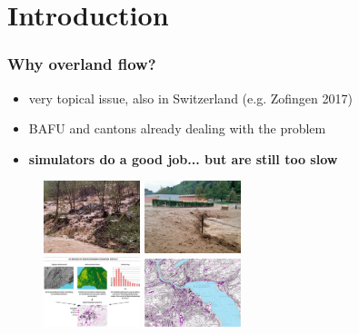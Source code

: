\documentclass[xcolor=dvipsnames, USenglish]{beamer}  %
\begin{document}
\section{Introduction}
  \begin{frame}
    \frametitle{Why overland flow?}
    \begin{itemize}
      \item very topical issue, also in Switzerland (e.g. Zofingen 2017)
      \item BAFU and cantons already dealing with the problem
      \item \textbf{simulators do a good job... but are still too slow}
    \end{itemize}
    
    \begin{figure}
      \centering
        \includegraphics[width=0.25\textwidth]{img/overlandflow1.jpg}
        \quad
        \includegraphics[width=0.25\textwidth]{img/overlandflow2.jpg}
        \\
        \includegraphics[width=0.25\textwidth]{img/overlandflow_map1.jpg}
        \quad
        \includegraphics[width=0.25\textwidth]{img/overlandflow_map2.jpg}
    \end{figure}
  \end{frame}
\end{document}
